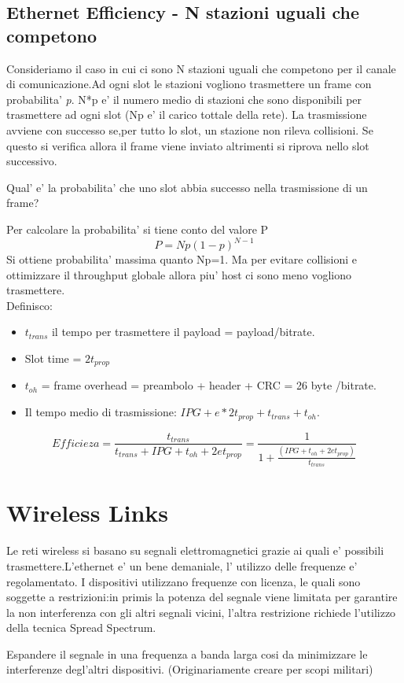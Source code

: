 \subsection{Ethernet Efficiency - N stazioni uguali che competono}
Consideriamo il caso in cui ci sono N stazioni uguali che competono per il canale di comunicazione.Ad ogni slot le stazioni vogliono trasmettere un frame con probabilita' \textit{p}. N*p e' il numero medio di stazioni che sono disponibili per trasmettere ad ogni slot (Np e' il carico tottale della rete). La trasmissione avviene con successo se,per tutto lo slot, un stazione non rileva collisioni. Se questo si verifica allora il frame viene inviato altrimenti si riprova nello slot successivo.
\begin{Question}
  Qual' e' la probabilita' che uno slot abbia successo nella trasmissione di un frame?
\end{Question}
Per calcolare la probabilita' si tiene conto del valore P
\begin{equation}
  P=Np(1-p)^{N-1}
\end{equation}
Si ottiene probabilita' massima quanto Np=1. Ma per evitare collisioni e ottimizzare il throughput globale allora piu' host ci sono meno vogliono trasmettere. \\
Definisco:
\begin{itemize}
  \item $t_{trans}$ il tempo per trasmettere il payload = payload/bitrate.
  \item Slot time = $2t_{prop}$
  \item $t_{oh}$ = frame overhead = preambolo + header + CRC = 26 byte /bitrate.
        \item Il tempo medio di trasmissione: $IPG + e*2t_{prop}+t_{trans}+t_{oh}$.
\end{itemize}
\begin{equation}
  Efficieza = \frac{t_{trans}}{t_{trans}+IPG+t_{oh}+2et_{prop}}= \frac{1}{1+\frac
    {(IPG+t_{oh}+2et_{prop})}{t_{trans}}}
\end{equation}
\section{Wireless Links}
Le reti wireless si basano su segnali elettromagnetici grazie ai quali e' possibili trasmettere.L'ethernet e' un bene demaniale, l' utilizzo delle frequenze e' regolamentato. I dispositivi utilizzano frequenze con licenza, le quali sono soggette a restrizioni:in primis la potenza del segnale viene limitata per garantire la non interferenza con gli altri segnali vicini, l'altra restrizione richiede l'utilizzo della tecnica Spread Spectrum. 
\begin{definition}
  Espandere il segnale in una frequenza a banda larga cosi da minimizzare le interferenze degl'altri dispositivi. (Originariamente creare per scopi militari)
\end{definition}
